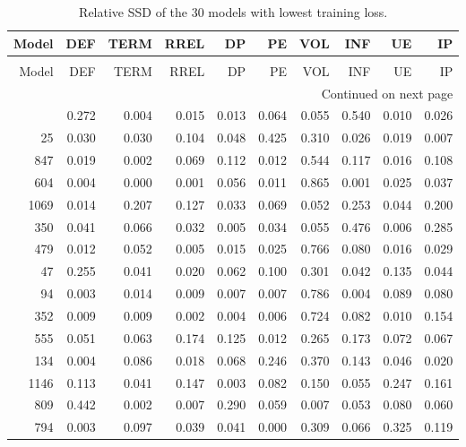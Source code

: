 \begin{longtable}{rrrrrrrrrr}
\caption{Relative SSD of the 30 models with lowest training loss.}
\label{tab:SSD_lossK_P_30}\\
\toprule
 Model &   DEF &  TERM &  RREL &    DP &    PE &   VOL &   INF &    UE &    IP \\
\midrule
\endfirsthead
\caption[]{Relative SSD of the 30 models with lowest training loss.} \\
\toprule
 Model &   DEF &  TERM &  RREL &    DP &    PE &   VOL &   INF &    UE &    IP \\
\midrule
\endhead
\midrule
\multicolumn{10}{r}{{Continued on next page}} \\
\midrule
\endfoot

\bottomrule
\endlastfoot
   558 & 0.272 & 0.004 & 0.015 & 0.013 & 0.064 & 0.055 & 0.540 & 0.010 & 0.026 \\
    25 & 0.030 & 0.030 & 0.104 & 0.048 & 0.425 & 0.310 & 0.026 & 0.019 & 0.007 \\
   847 & 0.019 & 0.002 & 0.069 & 0.112 & 0.012 & 0.544 & 0.117 & 0.016 & 0.108 \\
   604 & 0.004 & 0.000 & 0.001 & 0.056 & 0.011 & 0.865 & 0.001 & 0.025 & 0.037 \\
  1069 & 0.014 & 0.207 & 0.127 & 0.033 & 0.069 & 0.052 & 0.253 & 0.044 & 0.200 \\
   350 & 0.041 & 0.066 & 0.032 & 0.005 & 0.034 & 0.055 & 0.476 & 0.006 & 0.285 \\
   479 & 0.012 & 0.052 & 0.005 & 0.015 & 0.025 & 0.766 & 0.080 & 0.016 & 0.029 \\
    47 & 0.255 & 0.041 & 0.020 & 0.062 & 0.100 & 0.301 & 0.042 & 0.135 & 0.044 \\
    94 & 0.003 & 0.014 & 0.009 & 0.007 & 0.007 & 0.786 & 0.004 & 0.089 & 0.080 \\
   352 & 0.009 & 0.009 & 0.002 & 0.004 & 0.006 & 0.724 & 0.082 & 0.010 & 0.154 \\
   555 & 0.051 & 0.063 & 0.174 & 0.125 & 0.012 & 0.265 & 0.173 & 0.072 & 0.067 \\
   134 & 0.004 & 0.086 & 0.018 & 0.068 & 0.246 & 0.370 & 0.143 & 0.046 & 0.020 \\
  1146 & 0.113 & 0.041 & 0.147 & 0.003 & 0.082 & 0.150 & 0.055 & 0.247 & 0.161 \\
   809 & 0.442 & 0.002 & 0.007 & 0.290 & 0.059 & 0.007 & 0.053 & 0.080 & 0.060 \\
   794 & 0.003 & 0.097 & 0.039 & 0.041 & 0.000 & 0.309 & 0.066 & 0.325 & 0.119 \\

\end{longtable}
